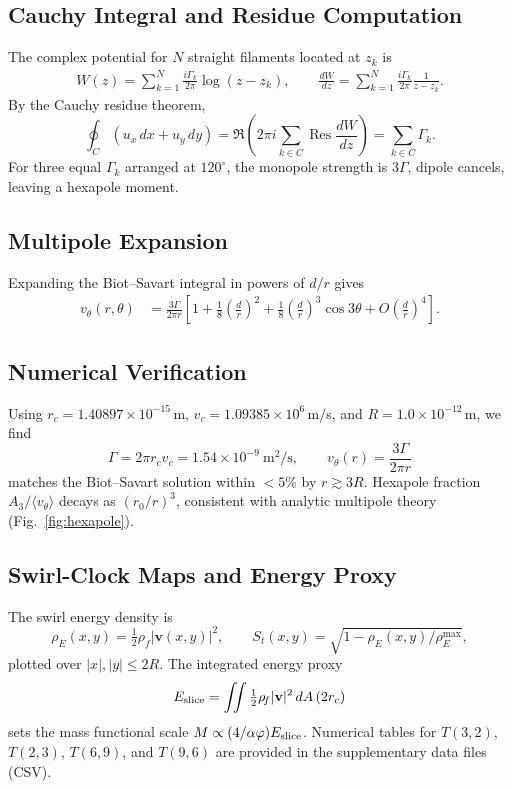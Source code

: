 \documentclass[reprint,aps,onecolumn,nofootinbib]{revtex4-2}
\begin{document}
    \subsection{Cauchy Integral and Residue Computation}
        The complex potential for $N$ straight filaments located at $z_k$ is
        \begin{align}
        W(z)=\sum_{k=1}^{N}\frac{i\Gamma_k}{2\pi}\log(z-z_k),
        \qquad
        \frac{dW}{dz}=\sum_{k=1}^{N}\frac{i\Gamma_k}{2\pi}\frac{1}{z-z_k}.
        \end{align}
        By the Cauchy residue theorem,
        \[
            \oint_{C} (u_x\,dx+u_y\,dy)
            =\Re\!\left(2\pi i\sum_{k\in C}\operatorname{Res}\frac{dW}{dz}\right)
            =\sum_{k\in C}\Gamma_k.
        \]
        For three equal $\Gamma_k$ arranged at $120^\circ$, the monopole strength is $3\Gamma$,
        dipole cancels, leaving a hexapole moment.

    \subsection{Multipole Expansion}
        Expanding the Biot--Savart integral in powers of $d/r$ gives
        \begin{align}
        v_\theta(r,\theta)
        &=\frac{3\Gamma}{2\pi r}\left[1+\frac{1}{8}\!\left(\frac{d}{r}\right)^2
        +\frac{1}{8}\!\left(\frac{d}{r}\right)^3\cos3\theta+O\!\left(\frac{d}{r}\right)^4\right].
        \end{align}

    \subsection{Numerical Verification}
        Using $r_c=1.40897\times10^{-15}\,$m, $v_c=1.09385\times10^{6}\,$m/s, and
        $R=1.0\times10^{-12}\,$m, we find
        \[
            \Gamma=2\pi r_c v_c=1.54\times 10^{-9}\ \mathrm{m^2/s},\qquad
            v_\theta(r)=\frac{3\Gamma}{2\pi r}
        \]
        matches the Biot--Savart solution within $<5\%$ by $r\gtrsim 3R$. Hexapole fraction
        $A_3/\langle v_\theta\rangle$ decays as $(r_0/r)^3$, consistent with analytic
        multipole theory (Fig.~\ref{fig:hexapole}).

    \subsection{Swirl-Clock Maps and Energy Proxy}
        The swirl energy density is
        \[
            \rho_{\!E}(x,y)=\tfrac12 \rho_{\!f}|\mathbf{v}(x,y)|^2,
            \qquad
            S_t(x,y)=\sqrt{1-\rho_{\!E}(x,y)/\rho_{\!E}^{\max}},
        \]
        plotted over $|x|,|y|\le 2R$. The integrated energy proxy
        \[
            E_{\rm slice}=\iint \tfrac12 \rho_{\!f}|\mathbf{v}|^2\,dA\,(2r_c)
        \]
        sets the mass functional scale $M\propto (4/\alpha\varphi) E_{\rm slice}$.
        Numerical tables for $T(3,2)$, $T(2,3)$, $T(6,9)$, and $T(9,6)$ are provided
        in the supplementary data files (CSV).
\end{document}
